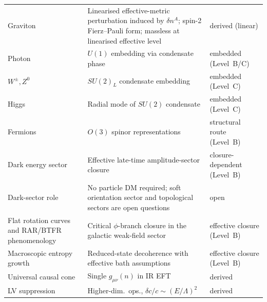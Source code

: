 \documentclass[11pt,a4paper]{article}
\numberwithin{equation}{section}
\begin{document}
\begin{longtable}{p{3.2cm}p{7.8cm}p{2.8cm}}
Graviton & Linearised effective-metric perturbation induced by $\delta n^A$;
     spin-2 Fierz--Pauli form; massless at linearised effective level & derived (linear) \\
Photon & $U(1)$ embedding via condensate phase & embedded (Level~B/C) \\
$W^\pm,Z^0$ & $SU(2)_L$ condensate embedding & embedded (Level~C) \\
Higgs & Radial mode of $SU(2)$ condensate & embedded (Level~C) \\
Fermions & $O(3)$ spinor representations & structural route (Level~B) \\
Dark energy sector & Effective late-time amplitude-sector closure & closure-dependent (Level~B) \\
Dark-sector role & No particle DM required; soft orientation sector and topological sectors are open questions & open \\
Flat rotation curves and RAR/BTFR phenomenology & Critical $\phi$-branch closure in the galactic weak-field sector & effective closure (Level~B) \\
Macroscopic entropy growth & Reduced-state decoherence with effective bath assumptions & effective closure (Level~B) \\
Universal causal cone & Single $g_{\mu\nu}(n)$ in IR EFT & derived \\
LV suppression & Higher-dim.\ ops., $\delta c/c\sim(E/\Lambda)^2$ & derived \\
\hline

\end{longtable}
\end{document}
